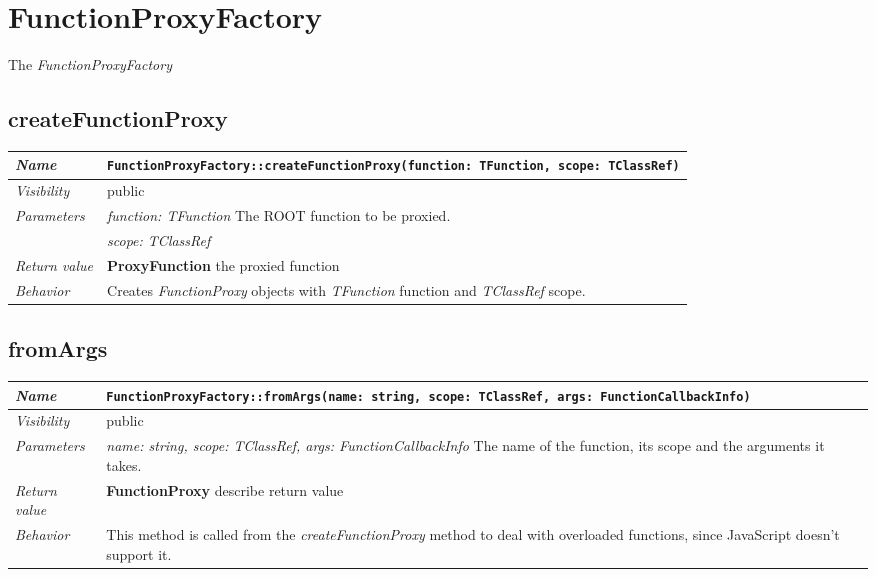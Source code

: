 \chapter{FunctionProxyFactory}
The \textit{FunctionProxyFactory} 
\section{createFunctionProxy}
\begin{longtable}{p{3cm} @{\hskip 1cm} p{12cm}}
 \hline
\textit{Name} & \texttt{FunctionProxyFactory::createFunctionProxy(function: TFunction, scope: TClassRef)}\\
\hline
 \textit{Visibility} & public\\
\hline
\textit{Parameters} & \textit{function: TFunction} The ROOT function to be proxied. \\ 
& \textit{scope: TClassRef}\\
\hline
\textit{Return value} & \textbf{ProxyFunction} the proxied function\\
  \hline
 \textit{Behavior} & Creates \textit{FunctionProxy} objects with \textit{TFunction} function and \textit{TClassRef} scope.\\
\hline
\end{longtable} \pagebreak
 \section{fromArgs}
\begin{longtable}{p{3cm} @{\hskip 1cm} p{12cm}}
 \hline	
\textit{Name} & \texttt{FunctionProxyFactory::fromArgs(name: string, scope: TClassRef, args: FunctionCallbackInfo)}\\
\hline
 \textit{Visibility} & public\\
\hline
\textit{Parameters} & \textit{name: string, scope: TClassRef, args: FunctionCallbackInfo} The name of the function, its scope and the arguments it takes.\\
\hline
\textit{Return value} & \textbf{FunctionProxy} describe return value\\
  \hline
 \textit{Behavior} & This method is called from the \textit{createFunctionProxy} method to deal with overloaded functions, since JavaScript doesn't support it.\\
\hline
\end{longtable} \pagebreak
